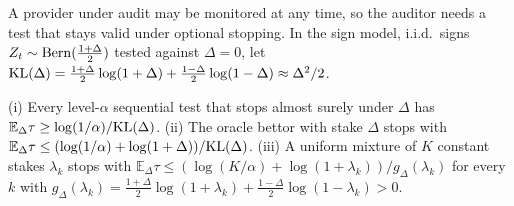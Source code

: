 A provider under audit may be monitored at any time, so the auditor needs a test that stays
valid under optional stopping. In the sign model, i.i.d.\ signs $Z_t\sim
\mathrm{Bern}(\frac{1+\Delta}2)$ tested against $\Delta=0$, let
$\mathrm{KL}(\Delta)=\frac{1+\Delta}2\log(1+\Delta)+\frac{1-\Delta}2\log(1-\Delta)\approx\Delta^2/2$.

\begin{proposition}\label{prop:anytime}
(i) Every level-$\alpha$ sequential test that stops almost surely under $\Delta$ has
$\mathbb{E}_\Delta\tau\ge\log(1/\alpha)/\mathrm{KL}(\Delta)$. (ii) The oracle bettor with stake
$\Delta$ stops with $\mathbb{E}_\Delta\tau\le(\log(1/\alpha)+\log(1+\Delta))/\mathrm{KL}(\Delta)$.
(iii) A uniform mixture of $K$ constant stakes $\lambda_k$ stops with
$\mathbb{E}_\Delta\tau\le(\log(K/\alpha)+\log(1+\lambda_k))/g_\Delta(\lambda_k)$ for every $k$
with $g_\Delta(\lambda_k)=\frac{1+\Delta}2\log(1+\lambda_k)+\frac{1-\Delta}2\log(1-\lambda_k)
>0$.
\end{proposition}
